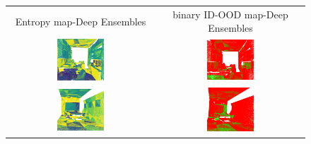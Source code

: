     \begin{figure}[h!]
        \centering
        \begin{tabular}{cc}
            Entropy map-Deep Ensembles & binary ID-OOD map-Deep Ensembles \\
            \includegraphics[width=0.33\textwidth, height=0.18\textheight]{images/ood_imgs/de_s3dis/ofc_3_de_ent.pdf}& 
            \includegraphics[width=0.33\textwidth, height=0.18\textheight]{images/ood_imgs/de_s3dis/de_ent_2.pdf}\\

            \includegraphics[width=0.33\textwidth, height=0.18\textheight]{images/ood_imgs/de_s3dis/cf1_de_ent.pdf}& 
            \includegraphics[width=0.33\textwidth, height=0.18\textheight]{images/ood_imgs/de_s3dis/de_ent_4.pdf}\\


\end{tabular}
\end{figure}
